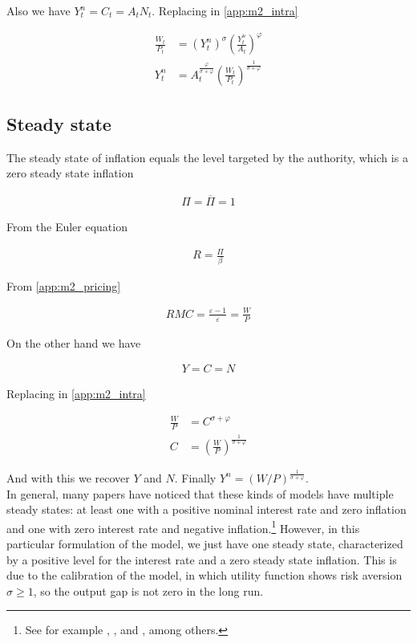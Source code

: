 \documentclass[12pt]{article}
\numberwithin{equation}{section}
\begin{document}
Also we have $Y_t^n=C_t=A_tN_t$. Replacing in \eqref{app:m2_intra}

\begin{align}
	\frac{W_t}{P_t}&=(Y_t^n)^{\sigma}\left(\frac{Y_t^n}{A_t}\right)^{\varphi}\nonumber\\
	Y_t^n&=A_t^{\frac{\varphi}{\sigma+\varphi}}\left(\frac{W_t}{P_t}\right)^{\frac{1}{\sigma+\varphi}}\label{app:m2_yn}
\end{align}

\subsection{Steady state}

The steady state of inflation equals the level targeted by the authority, which is a zero steady state inflation

\begin{align*}
	\Pi=\overline\Pi=1
\end{align*}

From the Euler equation

\begin{align*}
	R=\frac{\Pi}{\beta}
\end{align*}

From \eqref{app:m2_pricing}

\begin{align*}
	RMC=\frac{\varepsilon-1}{\varepsilon}=\frac{W}{P}
\end{align*}

On the other hand we have

\begin{align*}
	Y=C=N
\end{align*}

Replacing in \eqref{app:m2_intra}

\begin{align*}
	\frac{W}{P}&=C^{\sigma+\varphi}\\
	C&=\left(\frac{W}{P}\right)^{\frac{1}{\sigma+\varphi}}
\end{align*}

And with this we recover $Y$ and $N$. Finally $Y^n=(W/P)^{\frac{1}{\sigma+\varphi}}$.\\

In general, many papers have noticed that these kinds of models have multiple steady states: at least one with a positive nominal interest rate and zero inflation and one with zero interest rate and negative inflation.\footnote{See for example \cite{BenhabibEtAl2001}, \cite{BenhabibEtAl2001a}, \cite{BenhabibEtAl2002} and \cite{Fernandez-VillaverdeEtAl2015}, among others.} However, in this particular formulation of the model, we just have one steady state, characterized by a positive level for the interest rate and a zero steady state inflation. This is due to the calibration of the model, in which utility function shows risk aversion $\sigma\geq1$, so the output gap is not zero in the long run.
\end{document}
